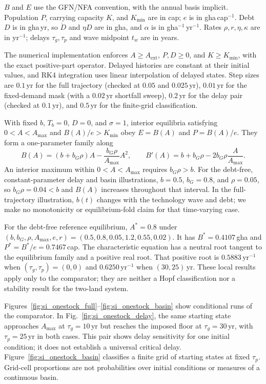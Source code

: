 \documentclass[11pt,a4paper]{article}
\begin{document}
$B$ and $E$ use the GFN/NFA convention, with the annual basis implicit. Population $P$, carrying capacity $K$, and $K_{\min}$ are in cap; $e$ is in gha\,cap$^{-1}$. Debt $D$ is in gha\,yr, so $\dot D$ and $\eta D$ are in gha, and $\alpha$ is in gha$^{-1}$\,yr$^{-1}$. Rates $\rho,r,\eta,\kappa$ are in yr$^{-1}$; delays $\tau_g,\tau_p$ and wave midpoint $t_w$ are in years.

The numerical implementation enforces $A\ge A_{\mathrm{ext}}$, $P,D\ge0$, and $K\ge K_{\min}$, with the exact positive-part operator. Delayed histories are constant at their initial values, and RK4 integration uses linear interpolation of delayed states. Step sizes are $0.1$\,yr for the full trajectory (checked at $0.05$ and $0.025$\,yr), $0.01$\,yr for the fixed-demand mask (with a $0.02$\,yr shortfall sweep), $0.2$\,yr for the delay pair (checked at $0.1$\,yr), and $0.5$\,yr for the finite-grid classification.

With fixed $b$, $T_b=0$, $D=0$, and $\sigma=1$, interior equilibria satisfying $0<A<A_{\max}$ and $B(A)/e>K_{\min}$ obey $E=B(A)$ and $P=B(A)/e$. They form a one-parameter family along
\[
B(A)=(b+b_G\rho)A-\frac{b_G\rho}{A_{\max}}A^2,\qquad
B'(A)=b+b_G\rho-2b_G\rho\frac{A}{A_{\max}}.
\]
An interior maximum within $0<A<A_{\max}$ requires $b_G\rho>b$. For the debt-free, constant-parameter delay and basin illustrations, $b=0.5$, $b_G=0.8$, and $\rho=0.05$, so $b_G\rho=0.04<b$ and $B(A)$ increases throughout that interval. In the full-trajectory illustration, $b(t)$ changes with the technology wave and debt; we make no monotonicity or equilibrium-fold claim for that time-varying case.

For the debt-free reference equilibrium, $A^*=0.8$ under $(b,b_G,\rho,A_{\max},e,r)=(0.5,0.8,0.05,1.2,0.55,0.02)$. It has $B^*=0.4107$\,gha and $P^*=B^*/e=0.7467$\,cap. The characteristic equation has a neutral root tangent to the equilibrium family and a positive real root. That positive root is $0.5883$\,yr$^{-1}$ when $(\tau_g,\tau_p)=(0,0)$ and $0.6250$\,yr$^{-1}$ when $(30,25)$\,yr. These local results apply only to the comparator; they are neither a Hopf classification nor a stability result for the two-land system.

Figures~\ref{fig:si_onestock_full}--\ref{fig:si_onestock_basin} show conditional runs of the comparator. In Fig.~\ref{fig:si_onestock_delay}, the same starting state approaches $A_{\max}$ at $\tau_g=10$\,yr but reaches the imposed floor at $\tau_g=30$\,yr, with $\tau_p=25$\,yr in both cases. This pair shows delay sensitivity for one initial condition; it does not establish a universal critical delay. Figure~\ref{fig:si_onestock_basin} classifies a finite grid of starting states at fixed $\tau_p$. Grid-cell proportions are not probabilities over initial conditions or measures of a continuous basin.
\end{document}
